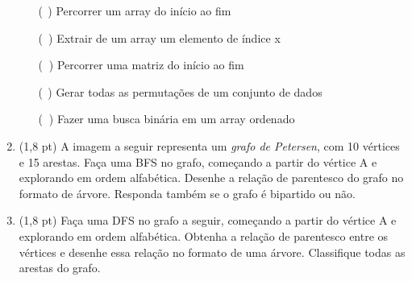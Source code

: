 \documentclass[a4paper,10pt]{article}
\begin{document}
\begin{multicols*}{2}
\begin{enumerate}
  \begin{enumerate}
    \item [(\textcolor{white}{c})] Percorrer um array do início ao fim
    \item [(\textcolor{white}{a})] Extrair de um array um elemento de índice x
    \item [(\textcolor{white}{d})] Percorrer uma matriz do início ao fim
    \item [(\textcolor{white}{e})] Gerar todas as permutações de um conjunto de dados
    \item [(\textcolor{white}{b})] Fazer uma busca binária em um array ordenado
  \end{enumerate}

  \vfill\null
  \columnbreak

  \item (1,8 pt) A imagem a seguir representa um \textit{grafo de Petersen}, com 10 vértices e 15 arestas. Faça uma BFS no grafo, começando a partir do vértice A e explorando em ordem alfabética. Desenhe a relação de parentesco do grafo no formato de árvore. Responda também se o grafo é bipartido ou não.

  \begin{center}
  \end{center}

  \item (1,8 pt) Faça uma DFS no grafo a seguir, começando a partir do vértice A e explorando em ordem alfabética. Obtenha a relação de parentesco entre os vértices e desenhe essa relação no formato de uma árvore. Classifique todas as arestas do grafo.


\end{enumerate}
\end{multicols*}
\end{document}
